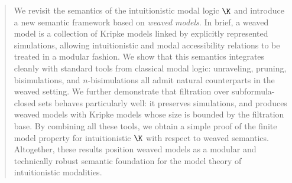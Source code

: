\begin{abstract}
    We revisit the semantics of the intuitionistic modal logic $\K$ and introduce a new semantic framework based on \emph{weaved models}. In brief, a weaved model is a collection of Kripke models linked by explicitly represented simulations, allowing intuitionistic and modal accessibility relations to be treated in a modular fashion. We show that this semantics integrates cleanly with standard tools from classical modal logic: unraveling, pruning, bisimulations, and $n$-bisimulations all admit natural counterparts in the weaved setting.
    We further demonstrate that filtration over subformula-closed sets behaves particularly well: it preserves simulations, and produces weaved models with Kripke models whose size is bounded by the filtration base. By combining all these tools, we obtain a simple proof of the finite model property for intuitionistic $\K$ with respect to weaved semantics. Altogether, these results position weaved models as a modular and technically robust semantic foundation for the model theory of intuitionistic modalities.
\end{abstract}